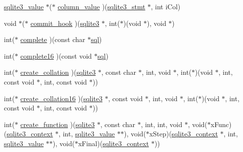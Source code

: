 \begin{DoxyCompactItemize}
\item 
\hyperlink{sqlite3_8h_ac2fa1ecdb2290d9af6010edbd1cbc83c}{sqlite3\+\_\+value} $\ast$($\ast$ \hyperlink{structsqlite3__api__routines_a1ca935310e3637179f857791ccb42116}{column\+\_\+value} )(\hyperlink{sqlite3_8h_af2a033da1327cdd77f0a174a09aedd0c}{sqlite3\+\_\+stmt} $\ast$, int i\+Col)
\item 
void $\ast$($\ast$ \hyperlink{structsqlite3__api__routines_a906bf080c41a7b3379866e08fe9f3db8}{commit\+\_\+hook} )(\hyperlink{sqlite3_8h_a0ef6f2646262c8a9b24368d8ac140f69}{sqlite3} $\ast$, int($\ast$)(void $\ast$), void $\ast$)
\item 
int($\ast$ \hyperlink{structsqlite3__api__routines_acf6be6ede31fda32f4f0193aafce0ba3}{complete} )(const char $\ast$\hyperlink{structsqlite3__api__routines_a0d4c8662baae0bd626f0ee334183e69e}{sql})
\item 
int($\ast$ \hyperlink{structsqlite3__api__routines_a12b69b88bc84fba6fe97cefa4b979eff}{complete16} )(const void $\ast$\hyperlink{structsqlite3__api__routines_a0d4c8662baae0bd626f0ee334183e69e}{sql})
\item 
int($\ast$ \hyperlink{structsqlite3__api__routines_a923433105b84b919ea359ef320da55b1}{create\+\_\+collation} )(\hyperlink{sqlite3_8h_a0ef6f2646262c8a9b24368d8ac140f69}{sqlite3} $\ast$, const char $\ast$, int, void $\ast$, int($\ast$)(void $\ast$, int, const void $\ast$, int, const void $\ast$))
\item 
int($\ast$ \hyperlink{structsqlite3__api__routines_ab3fe60d5c018e3ffcad08bec34dc53e7}{create\+\_\+collation16} )(\hyperlink{sqlite3_8h_a0ef6f2646262c8a9b24368d8ac140f69}{sqlite3} $\ast$, const void $\ast$, int, void $\ast$, int($\ast$)(void $\ast$, int, const void $\ast$, int, const void $\ast$))
\item 
int($\ast$ \hyperlink{structsqlite3__api__routines_a9f15bf465292b7176eddbf0287c770f8}{create\+\_\+function} )(\hyperlink{sqlite3_8h_a0ef6f2646262c8a9b24368d8ac140f69}{sqlite3} $\ast$, const char $\ast$, int, int, void $\ast$, void($\ast$x\+Func)(\hyperlink{sqlite3_8h_a3b519553ffec8fc42b2356f5b1ebdc57}{sqlite3\+\_\+context} $\ast$, int, \hyperlink{sqlite3_8h_ac2fa1ecdb2290d9af6010edbd1cbc83c}{sqlite3\+\_\+value} $\ast$$\ast$), void($\ast$x\+Step)(\hyperlink{sqlite3_8h_a3b519553ffec8fc42b2356f5b1ebdc57}{sqlite3\+\_\+context} $\ast$, int, \hyperlink{sqlite3_8h_ac2fa1ecdb2290d9af6010edbd1cbc83c}{sqlite3\+\_\+value} $\ast$$\ast$), void($\ast$x\+Final)(\hyperlink{sqlite3_8h_a3b519553ffec8fc42b2356f5b1ebdc57}{sqlite3\+\_\+context} $\ast$))
\item 

\end{DoxyCompactItemize}
